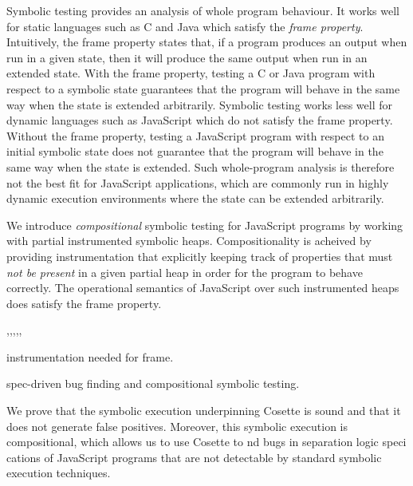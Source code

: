 \documentclass[sigconf, anonymous, review]{acmart}
\begin{document}
Symbolic testing provides an analysis of whole program behaviour. It
works well for static languages such as C and Java which satisfy the
{\em frame property}. Intuitively, the frame property states that, if
a program produces an output when run in a given state, then it will
produce the same output when run in an extended state. With the frame
property, testing a C or Java program with respect to a symbolic state
guarantees that the program will behave in the same way when the state
is extended arbitrarily.  Symbolic testing works less well for dynamic
languages such as JavaScript which do not satisfy the frame property.
Without the frame property, testing a JavaScript program with respect
to an initial symbolic state does not guarantee that the program will
behave in the same way when the state is extended.  Such whole-program
analysis is therefore not the best fit for JavaScript applications,
which are commonly run in highly dynamic execution environments
 where the state can be extended  arbitrarily. 





 We introduce {\em compositional} symbolic testing for JavaScript
 programs by working with partial instrumented symbolic heaps.
 Compositionality is acheived by providing instrumentation that
 explicitly keeping track of properties that must {\em not be present}
 in a given partial heap in order for the program to behave correctly.
 The operational semantics of JavaScript over such instrumented heaps does satisfy the frame
 property.  

,,,,,







instrumentation needed for frame. 

spec-driven bug finding and compositional symbolic testing. 





We prove that the symbolic execution underpinning Cosette is sound and
that it does not generate false positives. Moreover, this symbolic
execution is compositional, which allows us to use Cosette to  nd bugs
in separation logic speci cations of JavaScript programs that are not
detectable by standard symbolic execution techniques. 

\end{document}
